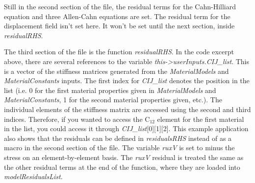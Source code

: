 \documentclass[10pt]{article} %
\begin{document}
Still in the second section of the file, the residual terms for the Cahn-Hilliard equation and three Allen-Cahn equations are set. The residual term for the displacement field isn't set here. It won't be set until the next section, inside \emph{residualRHS}.

The third section of the file is the function \emph{residualRHS}. In the code excerpt above, there are several references to the variable \emph{this->userInputs.CIJ\_list}. This is a vector of the stiffness matrices generated from the \emph{MaterialModels} and \emph{MaterialConstants} inputs. The first index for \emph{CIJ\_list} denotes the position in the list (i.e. 0 for the first material properties given in \emph{MaterialModels} and \emph{MaterialConstants}, 1 for the second material properties given, etc.). The individual elements of the stiffness matrix are accessed using the second and third indices. Therefore, if you wanted to access the C$_{12}$ element for the first material in the list, you could access it through \emph{CIJ\_list}[0][1][2]. This example application also shows that the residuals can be defined in \emph{residualsRHS} instead of as a macro in the second section of the file. The variable \emph{ruxV} is set to minus the stress on an element-by-element basis. The \emph{ruxV} residual is treated the same as the other residual terms at the end of the function, where they are loaded into \emph{modelResidualsList}.
\end{document}
